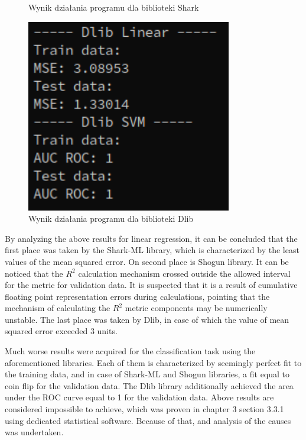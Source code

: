 \begin{figure}[!ht]
\begin{minipage}{0.31\textwidth}
		\caption{Wynik działania programu dla biblioteki Shark}
		\label{fig:shark_linear_svm}		
	\end{minipage}%
	\hspace{0.02\textwidth}
	\begin{minipage}{0.31\textwidth}
		\centering
		\includegraphics[width=0.8\textwidth]{Rysunki/Rozdzial7/dlib}
		\caption{Wynik działania programu dla biblioteki Dlib}
		\label{fig:dlib_linear_svm}
	\end{minipage}
\end{figure}

By analyzing the above results for linear regression, it can be concluded that the first place was taken by the Shark-ML library, which is characterized by the least values of the mean squared error. On second place is Shogun library. It can be noticed that the $R^2$ calculation mechanism crossed outside the allowed interval for the metric for validation data. It is suspected that it is a result of cumulative floating point representation errors during calculations, pointing that the mechanism of calculating the $R^2$ metric components may be numerically unstable. The last place was taken by Dlib, in case of which the value of mean squared error exceeded 3 units.

Much worse results were acquired for the classification task using the aforementioned libraries. Each of them is characterized by seemingly perfect fit to the training data, and in case of Shark-ML and Shogun libraries, a fit equal to coin flip for the validation data. The Dlib library additionally achieved the area under the ROC curve equal to 1 for the validation data. Above results are considered impossible to achieve, which was proven in chapter 3 section 3.3.1 using dedicated statistical software. Because of that, and analysis of the causes was undertaken.

